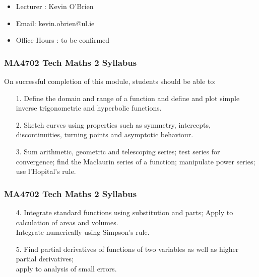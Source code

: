 \documentclass{beamer}
\begin{document}
	\begin{frame}
		\Large
		\begin{itemize}
			\item Lecturer :  Kevin O'Brien
			\item Email: kevin.obrien@ul.ie
			\item Office Hours : to be confirmed
		\end{itemize}
	\end{frame}
\begin{frame}
	\frametitle{MA4702 Tech Maths 2 Syllabus}
	
On successful completion of this module, students should be able to:
\begin{itemize}
\item[1.] Define the domain and range of a function and define and plot simple inverse trigonometric and hyperbolic  functions. 

\item[2.] Sketch curves using properties such as symmetry, intercepts, discontinuities, turning points and asymptotic behaviour. 

\item[3.] Sum arithmetic, geometric and telescoping series; test series for convergence; find the Maclaurin series of a function; manipulate power series; use l'Hopital's rule. 
\end{itemize}
\end{frame}

\begin{frame}
\frametitle{MA4702 Tech Maths 2 Syllabus}
	
\begin{itemize}
	\item[4.] Integrate standard functions using substitution and parts; Apply to calculation of areas and volumes. \\ Integrate numerically using Simpson's rule. 

\item[5.] Find partial derivatives of functions of two variables as well as higher partial derivatives;\\ apply to analysis of small errors.
\end{itemize}
\end{frame}
\end{document}
